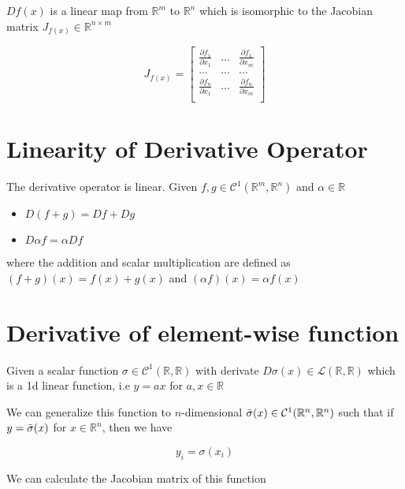 \documentclass{article}
\begin{document}
$Df(x)$ is a linear map from $\mathbb{R}^m$ to $\mathbb{R}^n$ which is isomorphic to the Jacobian matrix $J_{f(x)} \in \mathbb{R}^{n \times m}$

\begin{equation}
J_{f(x)} = \begin{bmatrix}
\frac{\partial f_1}{\partial x_1} & ... & \frac{\partial f_1}{\partial x_m} \\
... & ... & ... \\
\frac{\partial f_n}{\partial x_1} & ... & \frac{\partial f_n}{\partial x_m} \\
\end{bmatrix}    
\end{equation}

\section{Linearity of Derivative Operator}

The derivative operator is linear. Given $f, g \in \mathcal{C}^1(\mathbb{R}^m, \mathbb{R}^n)$ and $\alpha \in \mathbb{R}$

\begin{itemize}
    \item $D(f + g) = Df + Dg$
    \item $D \alpha f = \alpha D f$
\end{itemize}

where the addition and scalar multiplication are defined as $(f + g)(x) = f(x) + g(x)$ and $(\alpha f)(x) = \alpha f(x)$



\section{Derivative of element-wise function}

Given a scalar function $\sigma \in \mathcal{C}^1(\mathbb{R}, \mathbb{R})$ with derivate $D\sigma(x) \in \mathcal{L}(\mathbb{R}, \mathbb{R})$ which is a 1d linear function, i.e $y = ax$ for $a, x \in \mathbb{R}$

We can generalize this function to $n$-dimensional $\Bar{\sigma}(x) \in \mathcal{C}^1(\mathbb{R}^n, \mathbb{R}^n)$ such that if $y = \Bar{\sigma}(x)$ for $x \in \mathbb{R}^n$, then we have

\begin{equation}
    y_i = \sigma(x_i)    
\end{equation}

We can calculate the Jacobian matrix of this function
\end{document}
